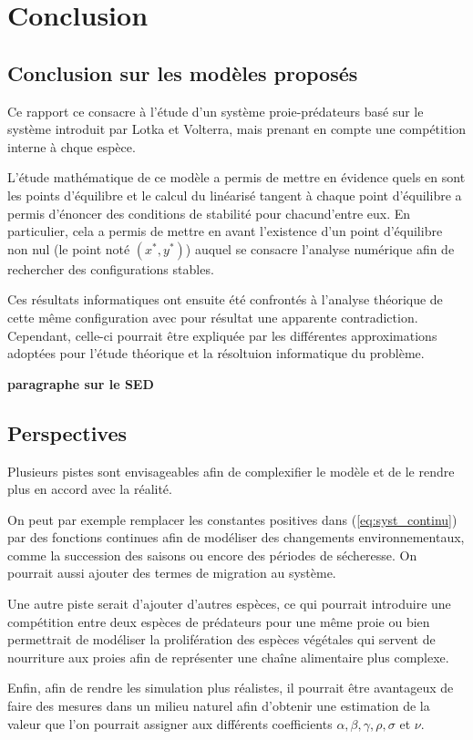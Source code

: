 \chapter{Conclusion}
\label{ch:Conclusion} 

\section{Conclusion sur les modèles proposés}

Ce rapport ce consacre à l'étude d'un système proie-prédateurs basé sur le système introduit par Lotka et Volterra, mais prenant en compte une compétition interne à chque espèce. 

L'étude mathématique de ce modèle a permis de mettre en évidence quels en sont les points d'équilibre et le calcul du linéarisé tangent à chaque point d'équilibre a permis d'énoncer des conditions de stabilité pour chacund'entre eux. En particulier, cela a permis de mettre en avant l'existence d'un point d'équilibre non nul (le point noté $(x^*, y^*)$) auquel se consacre l'analyse numérique afin de rechercher des configurations stables.

Ces résultats informatiques ont ensuite été confrontés à l'analyse théorique de cette même configuration avec pour résultat une apparente contradiction. Cependant, celle-ci pourrait être expliquée par les différentes approximations adoptées pour l'étude théorique et la résoltuion informatique du problème.

\vspace{0.3cm}
\textbf{paragraphe sur le SED}

\section{Perspectives}

Plusieurs pistes sont envisageables afin de complexifier le modèle et de le rendre plus en accord avec la réalité.

On peut par exemple remplacer les constantes positives dans (\ref{eq:syst_continu}) par des fonctions continues afin de modéliser des changements environnementaux, comme la succession des saisons ou encore des périodes de sécheresse. On pourrait aussi ajouter des termes de migration au système.

Une autre piste serait d'ajouter d'autres espèces, ce qui pourrait introduire une compétition entre deux espèces de prédateurs pour une même proie ou bien permettrait de modéliser la prolifération des espèces végétales qui servent de nourriture aux proies afin de représenter une chaîne alimentaire plus complexe.

\vspace{0.3cm}
Enfin, afin de rendre les simulation plus réalistes, il pourrait être avantageux de faire des mesures dans un milieu naturel afin d'obtenir une estimation de la valeur que l'on pourrait assigner aux différents coefficients $\alpha, \beta, \gamma, \rho, \sigma$ et $\nu$.
